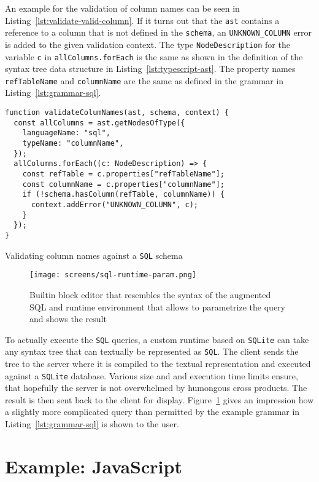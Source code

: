 \documentclass[sigconf,natbib=false,review=true,anonymous]{acmart}
\begin{document}
An example for the validation of column names can be seen in Listing~\ref{lst:validate-valid-column}. If it turns out that the \texttt{ast} contains a reference to a column that is not defined in the \texttt{schema}, an \texttt{UNKNOWN\_COLUMN} error is added to the given validation context. The type \texttt{NodeDescription} for the variable \texttt{c} in \texttt{allColumns.forEach} is the same as shown in the definition of the syntax tree data structure in Listing~\ref{lst:typescript-ast}. The property names \texttt{refTableName} and \texttt{columnName} are the same as defined in the grammar in Listing~\ref{lst:grammar-sql}.

\begin{listing}[H]
\begin{verbatim}
function validateColumNames(ast, schema, context) {
  const allColumns = ast.getNodesOfType({
    languageName: "sql",
    typeName: "columnName",
  });
  allColumns.forEach((c: NodeDescription) => {
    const refTable = c.properties["refTableName"];
    const columnName = c.properties["columnName"];
    if (!schema.hasColumn(refTable, columnName)) {
      context.addError("UNKNOWN_COLUMN", c);
    }
  });
}
\end{verbatim}
\caption{Validating column names against a \texttt{SQL} schema}
\label{lst:validate-valid-column}
\end{listing}

\begin{figure}
  \texttt{[image: screens/sql-runtime-param.png]}
  \caption{Builtin block editor that resembles the syntax of the augmented SQL and runtime environment that allows to parametrize the query and shows the result}
  \label{fig:sql-runtime}
\end{figure}

To actually execute the \texttt{SQL} queries, a custom runtime based on \texttt{SQLite} can take any syntax tree that can textually be represented as \texttt{SQL}. The client sends the tree to the server where it is compiled to the textual representation and executed against a \texttt{SQLite} database. Various size and and execution time limits ensure, that hopefully the server is not overwhelmed by humongous cross products. The result is then sent back to the client for display. Figure~\ref{fig:sql-runtime} gives an impression how a slightly more complicated query than permitted by the example grammar in Listing~\ref{lst:grammar-sql} is shown to the user.

\section{Example: JavaScript}
\end{document}
